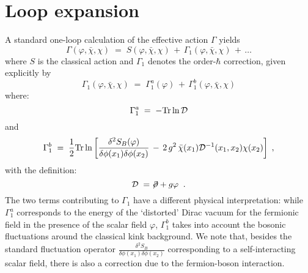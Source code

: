 \documentclass[a4paper,12pt]{article}
\begin{document}
\section{Loop expansion}\label{sec:loop}
A standard one-loop calculation of the effective action $\Gamma$
yields~\cite{zinn}
\begin{equation}
  \label{eq:onel}
\Gamma(\varphi,{\bar\chi},\chi) \;=\; S(\varphi,{\bar\chi},\chi)
\,+\, \Gamma_1(\varphi,{\bar\chi},\chi) \,+\,\ldots
\end{equation}
where $S$ is the classical action and $\Gamma_1$ denotes the
order-$\hbar$ correction, given explicitly by
\begin{equation}
  \label{eq:defg1}
\Gamma_1(\varphi,{\bar\chi},\chi)\;=\; \Gamma_1^a (\varphi) \,+\, \Gamma_1^b(\varphi,{\bar\chi},\chi)
\end{equation} 
where:
\begin{equation}
  \label{eq:defg1a}
\Gamma_1^a \;=\; -{\rm Tr}\ln{\mathcal D}
\end{equation}
and
\begin{equation}
  \label{eq:defg1b}
\Gamma_1^b\;=\;\frac{1}{2} {\rm Tr} \ln 
\left[ \frac{\delta^2 S_B(\varphi)}{\delta\phi(x_1)
\delta\phi(x_2)} \,-\,2 \, g^2 \, {\bar\chi}(x_1) {\mathcal D}^{-1}(x_1,x_2) 
\chi(x_2) \right] \;,
\end{equation}
with the definition:
\begin{equation}
  \label{eq:defcald1}
{\mathcal D}\;=\; \not \! \partial + g \varphi \;\;.
\end{equation}
The two terms contributing to $\Gamma_1$ have a different physical
interpretation: while $\Gamma_1^a$ corresponds to the energy of the
`distorted' Dirac vacuum for the fermionic field in the presence of
the scalar field $\varphi$, $\Gamma_1^b$ takes into account the bosonic
fluctuations around the classical kink background.  We note that,
besides the standard fluctuation operator
$\frac{\delta^2S_B}{\delta\phi(x_1)\delta\phi(x_2)}$ corresponding to a self-interacting
scalar field, there is also a correction due to the fermion-boson
interaction.
 
\end{document}
